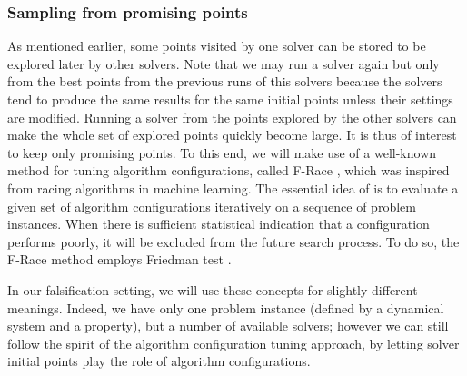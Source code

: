 \subsubsection*{Sampling from promising points}
As mentioned earlier, some points visited by one solver can be stored to be explored later by other solvers. Note that we may run a solver again but only from the best points from the previous runs of this solvers because the solvers tend to produce the same results for the same initial points unless their settings are modified. Running a solver from the points explored by the other solvers can make the whole set of explored points quickly become large. It is thus of interest to keep only promising points. To this end, we will make use of a well-known method for tuning algorithm configurations, called F-Race \cite{FRace2010}, which was inspired from racing algorithms in machine learning. The essential idea of is to evaluate a given set of algorithm configurations iteratively on a sequence of problem instances. When there is sufficient statistical indication that a configuration performs poorly, it will be excluded from the future search process. To do so, the F-Race method employs Friedman test \cite{Conover1999}. 


In our falsification setting, we will use these concepts for slightly different meanings. Indeed, we have only one problem instance (defined by a dynamical system and a property), but a number of available solvers; however we can still follow the spirit of the algorithm configuration tuning approach, by letting solver initial points play the role of algorithm configurations.

